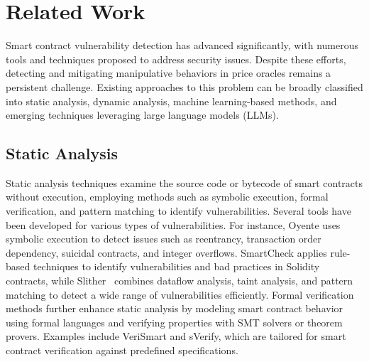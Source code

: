 \section{Related Work}\label{sec:related}

Smart contract vulnerability detection has advanced significantly, with numerous tools and techniques proposed to address security issues. Despite these efforts, detecting and mitigating manipulative behaviors in price oracles remains a persistent challenge. Existing approaches to this problem can be broadly classified into static analysis, dynamic analysis, machine learning-based methods, and emerging techniques leveraging large language models (LLMs).

\subsection{Static Analysis} \label{Static Analysis}
Static analysis techniques examine the source code or bytecode of smart contracts without execution, employing methods such as symbolic execution, formal verification, and pattern matching to identify vulnerabilities. Several tools have been developed for various types of vulnerabilities. For instance, Oyente\cite{luu2016oyente} uses symbolic execution to detect issues such as reentrancy, transaction order dependency, suicidal contracts, and integer overflows. SmartCheck\cite{tikhomirov2018smartcheck} applies rule-based techniques to identify vulnerabilities and bad practices in Solidity contracts, while Slither~\cite{feist2019slither} combines dataflow analysis, taint analysis, and pattern matching to detect a wide range of vulnerabilities efficiently.
Formal verification methods further enhance static analysis by modeling smart contract behavior using formal languages and verifying properties with SMT solvers or theorem provers. Examples include VeriSmart\cite{so2020verismart} and sVerify\cite{gao2021sverify}, which are tailored for smart contract verification against predefined specifications.

